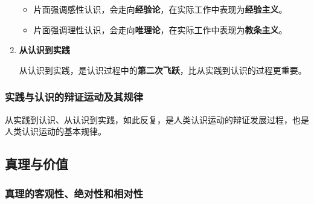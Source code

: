\documentclass[12pt, a4paper, oneside]{ctexart}
\begin{document}
\begin{enumerate}
  \begin{itemize}
    \item 片面强调感性认识，会走向\textbf{经验论}，在实际工作中表现为\textbf{经验主义}。
    \item 片面强调理性认识，会走向\textbf{唯理论}，在实际工作中表现为\textbf{教条主义}。
  \end{itemize}

  \item {\bf 从认识到实践}
  
  从认识到实践，是认识过程中的\textbf{第二次飞跃}，比从实践到认识的过程更重要。

\end{enumerate}

\subsubsection{实践与认识的辩证运动及其规律}

从实践到认识、从认识到实践，如此反复，是人类认识运动的辩证发展过程，也是人类认识运动的基本规律。

\subsection{真理与价值}

\subsubsection{真理的客观性、绝对性和相对性}
\end{document}
